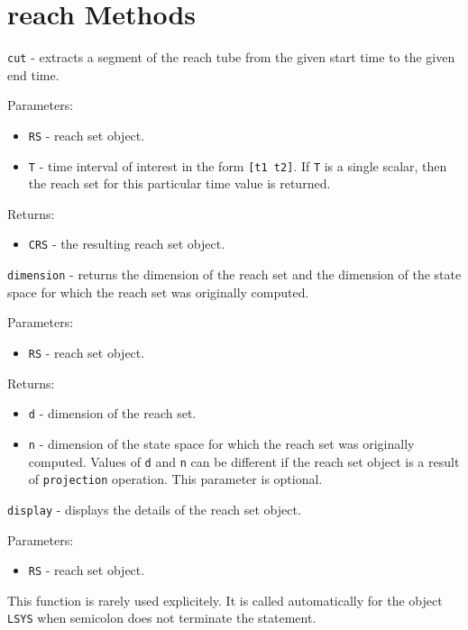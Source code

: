 \section{reach Methods}
{\Large {\tt cut}} - extracts a segment of the reach tube from the given start
time to the given end time.

Parameters:
\begin{itemize}
\item {\tt RS} - reach set object.
\item {\tt T} - time interval of interest in the form {\tt [t1 t2]}.
If {\tt T} is a single scalar, then the reach set for this particular time
value is returned.
\end{itemize}

Returns:
\begin{itemize}
\item {\tt CRS} - the resulting reach set object.
\end{itemize}

\newpage

{\Large {\tt dimension}} - returns the dimension of the reach set and
the dimension of the state space for which the reach set was originally
computed.

Parameters:
\begin{itemize}
\item {\tt RS} - reach set object.
\end{itemize}

Returns:
\begin{itemize}
\item {\tt d} - dimension of the reach set.
\item {\tt n} - dimension of the state space for which the reach set was
originally computed. Values of {\tt d} and {\tt n} can be different if
the reach set object is a result of {\tt projection} operation.
This parameter is optional.
\end{itemize}

\newpage

{\Large {\tt display}} - displays the details of the reach set object.

Parameters:
\begin{itemize}
\item {\tt RS} - reach set object.
\end{itemize}
This function is rarely used explicitely. It is called automatically
for the object {\tt LSYS} when semicolon does not terminate the statement.

\newpage

